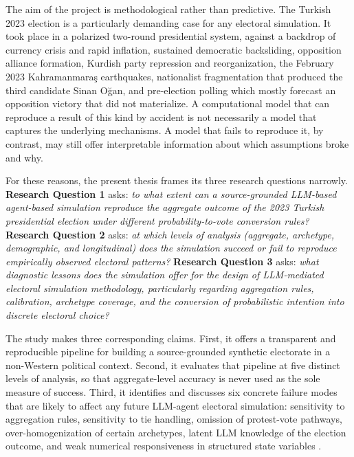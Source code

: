 \documentclass[12pt,a4paper]{report}
\begin{document}
The aim of the project is methodological rather than predictive. The Turkish 2023 election is a particularly demanding case for any electoral simulation. It took place in a polarized two-round presidential system, against a backdrop of currency crisis and rapid inflation, sustained democratic backsliding, opposition alliance formation, Kurdish party repression and reorganization, the February 2023 Kahramanmaraş earthquakes, nationalist fragmentation that produced the third candidate Sinan Oğan, and pre-election polling which mostly forecast an opposition victory that did not materialize. A computational model that can reproduce a result of this kind by accident is not necessarily a model that captures the underlying mechanisms. A model that fails to reproduce it, by contrast, may still offer interpretable information about which assumptions broke and why.

For these reasons, the present thesis frames its three research questions narrowly. \textbf{Research Question 1} asks: \emph{to what extent can a source-grounded LLM-based agent-based simulation reproduce the aggregate outcome of the 2023 Turkish presidential election under different probability-to-vote conversion rules?} \textbf{Research Question 2} asks: \emph{at which levels of analysis (aggregate, archetype, demographic, and longitudinal) does the simulation succeed or fail to reproduce empirically observed electoral patterns?} \textbf{Research Question 3} asks: \emph{what diagnostic lessons does the simulation offer for the design of LLM-mediated electoral simulation methodology, particularly regarding aggregation rules, calibration, archetype coverage, and the conversion of probabilistic intention into discrete electoral choice?}

The study makes three corresponding claims. First, it offers a transparent and reproducible pipeline for building a source-grounded synthetic electorate in a non-Western political context. Second, it evaluates that pipeline at five distinct levels of analysis, so that aggregate-level accuracy is never used as the sole measure of success. Third, it identifies and discusses six concrete failure modes that are likely to affect any future LLM-agent electoral simulation: sensitivity to aggregation rules, sensitivity to tie handling, omission of protest-vote pathways, over-homogenization of certain archetypes, latent LLM knowledge of the election outcome, and weak numerical responsiveness in structured state variables \citep{kang2026dynamok,qu2024performance,rettenberger2025politicalbias}.
\end{document}
